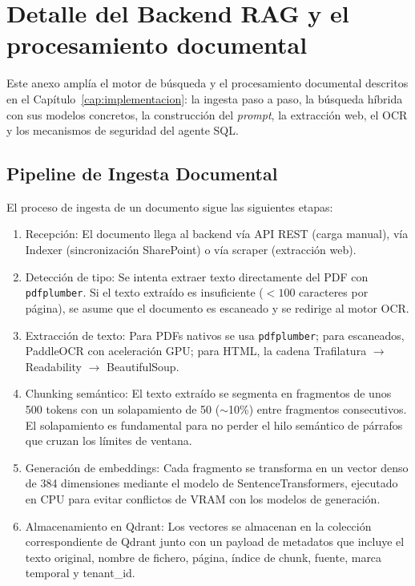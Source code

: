 \chapter{Detalle del Backend RAG y el procesamiento documental}
\label{anexo:backend}

Este anexo amplía el motor de búsqueda y el procesamiento documental descritos en el Capítulo~\ref{cap:implementacion}: la ingesta paso a paso, la búsqueda híbrida con sus modelos concretos, la construcción del \textit{prompt}, la extracción web, el OCR y los mecanismos de seguridad del agente SQL.

\section{Pipeline de Ingesta Documental}
\label{anexo:ingesta}

El proceso de ingesta de un documento sigue las siguientes etapas:

\begin{enumerate}
    \item Recepción: El documento llega al backend vía API REST (carga manual), vía Indexer (sincronización SharePoint) o vía scraper (extracción web).

    \item Detección de tipo: Se intenta extraer texto directamente del PDF con \texttt{pdfplumber}. Si el texto extraído es insuficiente ($<100$ caracteres por página), se asume que el documento es escaneado y se redirige al motor OCR.

    \item Extracción de texto: Para PDFs nativos se usa \texttt{pdfplumber}; para escaneados, PaddleOCR con aceleración GPU; para HTML, la cadena Trafilatura $\rightarrow$ Readability $\rightarrow$ BeautifulSoup.

    \item Chunking semántico: El texto extraído se segmenta en fragmentos de unos 500 tokens con un solapamiento de 50 ($\sim$10\%) entre fragmentos consecutivos. El solapamiento es fundamental para no perder el hilo semántico de párrafos que cruzan los límites de ventana.

    \item Generación de embeddings: Cada fragmento se transforma en un vector denso de 384 dimensiones mediante el modelo  de SentenceTransformers, ejecutado en CPU para evitar conflictos de VRAM con los modelos de generación.

    \item Almacenamiento en Qdrant: Los vectores se almacenan en la colección correspondiente de Qdrant junto con un payload de metadatos que incluye el texto original, nombre de fichero, página, índice de chunk, fuente, marca temporal y tenant\_id.
\end{enumerate}

